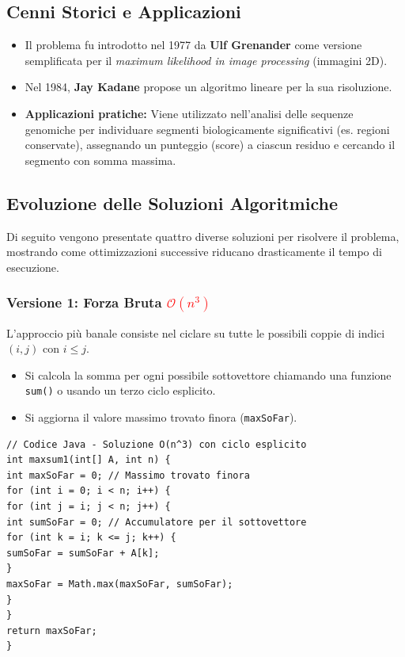 \documentclass[12pt, a4paper]{article}
\begin{document}
\subsection{Cenni Storici e Applicazioni}
\begin{itemize}
\item Il problema fu introdotto nel 1977 da \textbf{Ulf Grenander} come versione semplificata per il \textit{maximum likelihood in image processing} (immagini 2D).
\item Nel 1984, \textbf{Jay Kadane} propose un algoritmo lineare per la sua risoluzione.
\item \textbf{Applicazioni pratiche:} Viene utilizzato nell'analisi delle sequenze genomiche per individuare segmenti biologicamente significativi (es. regioni conservate), assegnando un punteggio (score) a ciascun residuo e cercando il segmento con somma massima.
\end{itemize}

\subsection{Evoluzione delle Soluzioni Algoritmiche}

Di seguito vengono presentate quattro diverse soluzioni per risolvere il problema, mostrando come ottimizzazioni successive riducano drasticamente il tempo di esecuzione.

\subsubsection{Versione 1: Forza Bruta \textcolor{red}{\texorpdfstring{$\mathcal{O}(n^3)$}{O(n^3)}}}
L'approccio più banale consiste nel ciclare su tutte le possibili coppie di indici $(i, j)$ con $i \le j$.
\begin{itemize}
\item Si calcola la somma per ogni possibile sottovettore chiamando una funzione \texttt{sum()} o usando un terzo ciclo esplicito.
\item Si aggiorna il valore massimo trovato finora (\texttt{maxSoFar}).
\end{itemize}

\begin{verbatim}
// Codice Java - Soluzione O(n^3) con ciclo esplicito
int maxsum1(int[] A, int n) {
int maxSoFar = 0; // Massimo trovato finora
for (int i = 0; i < n; i++) {
for (int j = i; j < n; j++) {
int sumSoFar = 0; // Accumulatore per il sottovettore
for (int k = i; k <= j; k++) {
sumSoFar = sumSoFar + A[k];
}
maxSoFar = Math.max(maxSoFar, sumSoFar);
}
}
return maxSoFar;
}
\end{verbatim}
\end{document}
